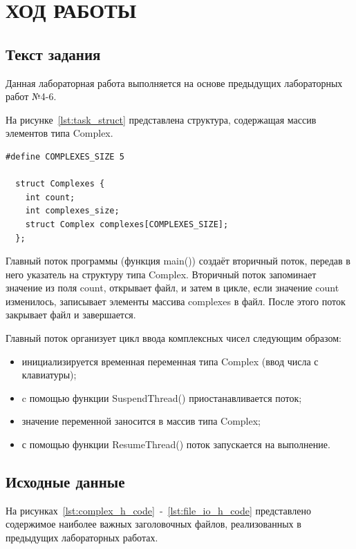 \section{ХОД РАБОТЫ}

\subsection{Текст задания}

Данная лабораторная работа выполняется на основе предыдущих лабораторных работ №4-6.

На рисунке~\ref{lst:task_struct} представлена структура, содержащая массив элементов типа Complex.

\begin{lstlisting}[caption=Структура\text{,} содержащая массив элементов типа Complex,label=lst:task_struct]
  #define COMPLEXES_SIZE 5

  struct Complexes {
    int count;
    int complexes_size;
    struct Complex complexes[COMPLEXES_SIZE];
  };
\end{lstlisting}

Главный поток программы (функция main()) создаёт вторичный поток, передав в него указатель на структуру типа Complex. Вторичный поток запоминает значение из поля count, открывает файл, и затем в цикле, если значение count изменилось, записывает элементы массива complexes в файл. После этого поток закрывает файл и завершается.

Главный поток организует цикл ввода комплексных чисел следующим образом:

\begin{itemize}
  \item инициализируется временная переменная типа Complex (ввод числа с клавиатуры);
  \item c помощью функции SuspendThread() приостанавливается поток;
  \item значение переменной заносится в массив типа Complex;
  \item с помощью функции ResumeThread() поток запускается на выполнение.
\end{itemize}

\newpage

\subsection{Исходные данные}


На рисунках~\ref{lst:complex_h_code}~-~\ref{lst:file_io_h_code} представлено содержимое наиболее важных заголовочных файлов, реализованных в предыдущих лабораторных работах.

